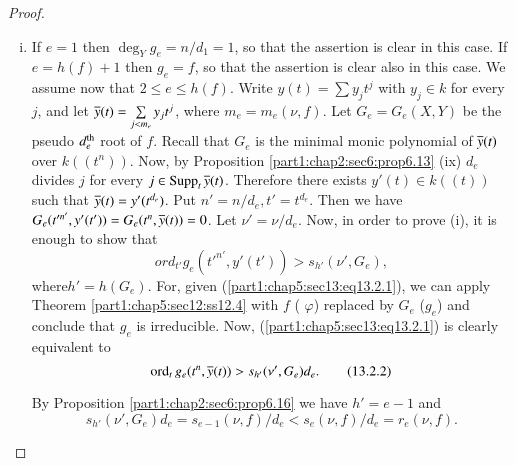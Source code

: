 \begin{proof}
~
\begin{enumerate}[(i)]
\item If $e=1$ then $\deg_Y g_e = n/d_1 =1$, so that the assertion is
  clear in this case. If $e= h(f)+1$ then $g_e =f$, so that the
  assertion is clear also in this case. We assume now that $2 \leq e
  \leq h(f)$. Write $y(t)= \sum y_jt^j$ with $y_j \in k$ for every
  $j$, and let $\overline{y}(t)= \sum\limits_{j < m_e} y_j t^j$, where $m_e = m_e
  (\nu, f)$. Let $G_e = G_e (X, Y)$ be the pseudo $d^{\rm th}_e$ root of
  $f$. Recall that $G_e$ is the minimal monic polynomial of
  $\overline{y}(t)$ over $k((t^n))$. Now, by Proposition
  \ref{part1:chap2:sec6:prop6.13} (ix) $d_e$ divides $j$ for every $j
  \in \operatorname{Supp}_t \overline{y}(t)$. Therefore  there exists $y'(t) \in k((t))$
  such that $\overline{y}(t) = y' (t^{d_e})$. Put $n' = n/d_e, t' =
  t^{d_e}$. Then we have $G_e (t'^{n'}, y' (t'))= G_e (t^n,
  \overline{y}(t))=0$. Let $\nu'= \nu/d_e$. Now, in order to prove (i), it
  is enough to show that
  \begin{equation*}
    ord_{t'} g_e (t'^{n'}, y' (t')) > s_{h'} (\nu', G_e),
    \tag{13.2.1}\label{part1:chap5:sec13:eq13.2.1}  
  \end{equation*}
  where\pageoriginale $h' = h(G_e)$. For, given (\ref{part1:chap5:sec13:eq13.2.1}),
  we can apply Theorem \ref{part1:chap5:sec12:ss12.4} with $f$ (\resp
  $\varphi$) replaced by $G_e$ (\resp $g_e$) and conclude that $g_e$
  is irreducible. Now, (\ref{part1:chap5:sec13:eq13.2.1}) is clearly
  equivalent to 
\begin{equation*}
  \operatorname{ord}_t g_e (t^n , \overline{y} (t))> s_{h'} (\nu', G_e)
  d_e. \tag{13.2.2}\label{part1:chap5:sec13:eq13.2.2} 
\end{equation*}

By Proposition \ref{part1:chap2:sec6:prop6.16} we have $h' = e-1$ and 
$$
s_{h'} (\nu', G_e) d_e = s_{e-1} (\nu, f)/d_e< s_e (\nu, f)/d_e= r_e
(\nu, f).
$$


\end{enumerate}
\end{proof}
